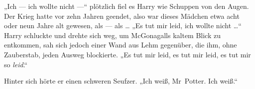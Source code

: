 „Ich — ich wollte nicht —“ plötzlich fiel es Harry wie Schuppen von den Augen. Der Krieg hatte vor zehn Jahren geendet, also war dieses Mädchen etwa acht oder neun Jahre alt gewesen, als — als …
„Es tut mir leid, ich wollte nicht …“ Harry schluckte und drehte sich weg, um McGonagalls kaltem Blick zu entkommen, sah sich jedoch einer Wand aus Lehm gegenüber, die ihm, ohne Zauberstab, jeden Ausweg blockierte.
„Es tut mir leid, es tut mir leid, es tut mir so \emph{leid}.“

Hinter sich hörte er einen schweren Seufzer.
„Ich weiß, Mr~Potter. Ich weiß.“


